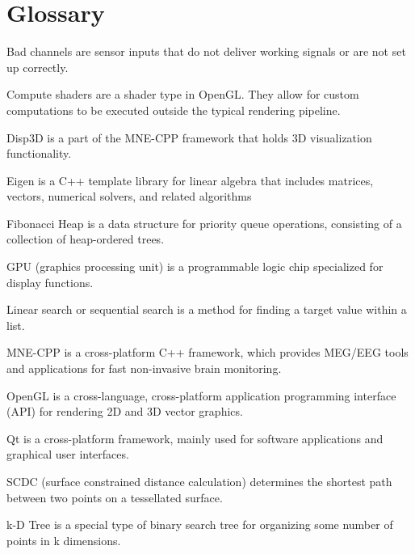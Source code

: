 \section {Glossary}
\begin{aims}

\item [Bad channels] are sensor inputs that do not deliver working signals or are not set up correctly.
\item [Compute shaders] are a shader type in OpenGL. They allow for custom computations to be executed outside the typical rendering pipeline.
\item [Disp3D] is a part of the MNE-CPP framework that holds 3D visualization functionality.
\item[Eigen] is a C++ template library for linear algebra that includes matrices, vectors, numerical solvers, and related algorithms
\item [Fibonacci Heap] is a data structure for priority queue operations, consisting of a collection of heap-ordered trees.
\item [GPU] (graphics processing unit) is a programmable logic chip specialized for display functions.
\item [Linear search] or sequential search is a method for finding a target value within a list.
\item [MNE-CPP] is a cross-platform C++ framework, which provides MEG/EEG tools and applications for fast non-invasive brain monitoring.
\item [OpenGL] is a cross-language, cross-platform application programming interface (API) for rendering 2D and 3D vector graphics.
\item [Qt] is a cross-platform framework, mainly used for software applications and graphical user interfaces.
\item [SCDC] (surface constrained distance calculation) determines the shortest path between two points on a tessellated surface.
\item[k-D Tree] is a special type of binary search tree for organizing some number of points in k dimensions.
\end{aims} 
